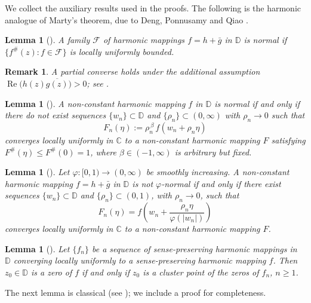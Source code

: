 \documentclass[10pt,a4paper]{amsart}
\newtheorem{lemma}[theorem]{Lemma}
\newtheorem{remark}[theorem]{Remark}
\newcommand{\D}{\mathbb{D}}
\newcommand{\C}{\mathbb{C}}
\newcommand{\Real}{\operatorname{Re}}
\begin{document}
We collect the auxiliary results used in the proofs. The following is the harmonic analogue of Marty's theorem, due to Deng, Ponnusamy and Qiao \cite{DPQ}.

\begin{lemma}[{\cite[Lemma~1]{DPQ}}]\label{lem:marty}
A family $\mathcal F$ of harmonic mappings $f=h+\bar g$ in $\D$ is normal if
$\{f^{\#}(z):f\in\mathcal F\}$ is locally uniformly bounded.
\end{lemma}

\begin{remark}\label{rem:martyconverse}
A partial converse holds under the additional assumption $\Real\big(h(z)\overline{g(z)}\big)>0$;
see \cite[Lemma~2.1]{BDP}.
\end{remark}

\begin{lemma}[{\cite[Theorem~1.2]{BT}}]\label{lem:resnormal}
A non-constant harmonic mapping $f$ in $\D$ is normal if and only if there do \emph{not}
exist sequences $\{w_{n}\}\subset\D$ and $\{\rho_{n}\}\subset(0,\infty)$ with $\rho_{n}\to0$
such that
\[
F_{n}(\eta):=\rho_{n}^{\,\beta}\,f(w_{n}+\rho_{n}\eta)
\]
converges locally uniformly in $\C$ to a non-constant harmonic mapping $F$ satisfying
$F^{\#}(\eta)\le F^{\#}(0)=1$, where $\beta\in(-1,\infty)$ is arbitrary but fixed.
\end{lemma}

\begin{lemma}[{\cite[Theorem~1.3]{BDP}}]\label{lem:phizalcman}
Let $\varphi\colon[0,1)\to(0,\infty)$ be smoothly increasing. A non-constant harmonic
mapping $f=h+\bar g$ in $\D$ is \emph{not} $\varphi$-normal if and only if there exist
sequences $\{w_{n}\}\subset\D$ and $\{\rho_{n}\}\subset(0,1)$, with $\rho_{n}\to0$, such that
\[
F_{n}(\eta)=f\!\left(w_{n}+\frac{\rho_{n}\eta}{\varphi(|w_{n}|)}\right)
\]
converges locally uniformly in $\C$ to a non-constant harmonic mapping $F$.
\end{lemma}

\begin{lemma}[{\cite[p.~10]{Duren}}]\label{lem:hurwitz}
Let $\{f_{n}\}$ be a sequence of sense-preserving harmonic mappings in $\D$ converging
locally uniformly to a sense-preserving harmonic mapping $f$. Then $z_{0}\in\D$ is a zero of
$f$ if and only if $z_{0}$ is a cluster point of the zeros of $f_{n}$, $n\ge1$.
\end{lemma}

The next lemma is classical (see \cite{Hayman}); we include a proof for completeness.
\end{document}
